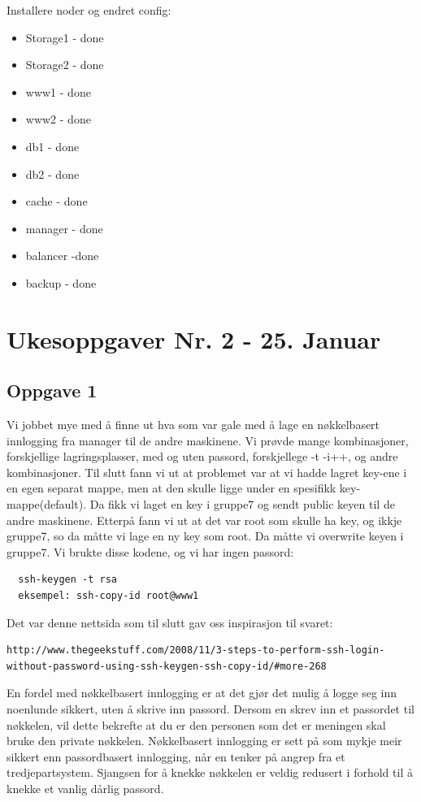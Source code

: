 \documentclass[a4paper, norsk, 12pt]{article}
\begin{document}
Installere noder og endret config:
\begin{itemize}
\item Storage1 - done
\item Storage2 - done
\item www1 - done
\item www2 - done
\item db1 - done
\item db2 - done
\item cache - done
\item manager - done
\item balancer -done
\item backup - done
\end{itemize}

\section{Ukesoppgaver Nr. 2 - 25. Januar}
\subsection{Oppgave 1}
Vi jobbet mye med å finne ut hva som var gale med å lage en nøkkelbasert innlogging fra manager til de andre maskinene. Vi prøvde mange kombinasjoner, forskjellige lagringsplasser, med og uten passord, forskjellege -t -i++, og andre kombinasjoner. Til slutt fann vi ut at problemet var at vi hadde lagret key-ene i en egen separat mappe, men at den skulle ligge under en spesifikk key-mappe(default). Da fikk vi laget en key i gruppe7 og sendt public keyen til de andre maskinene. Etterpå fann vi ut at det var root som skulle ha key, og ikkje gruppe7, so da måtte vi lage en ny key som root. Da måtte  vi overwrite keyen i gruppe7. Vi brukte disse kodene, og vi har ingen passord:\\
\begin{verbatim}
  ssh-keygen -t rsa
  eksempel: ssh-copy-id root@www1
\end{verbatim}
Det var denne nettsida som til slutt gav oss inspirasjon til svaret:\\
\begin{Verbatim}[samepage=true]
http://www.thegeekstuff.com/2008/11/3-steps-to-perform-ssh-login-without-password-using-ssh-keygen-ssh-copy-id/#more-268
\end{Verbatim}

En fordel med nøkkelbasert innlogging er at det gjør det mulig å logge seg inn noenlunde sikkert, uten å skrive inn passord. Dersom en skrev inn et passordet til nøkkelen, vil dette bekrefte at du er den personen som det er meningen skal bruke den private nøkkelen. Nøkkelbasert innlogging er sett på som mykje meir sikkert enn passordbasert innlogging, når en tenker på angrep fra et tredjepartsystem. Sjangsen for å knekke nøkkelen er veldig redusert i forhold til å knekke et vanlig dårlig passord.\\
\end{document}
